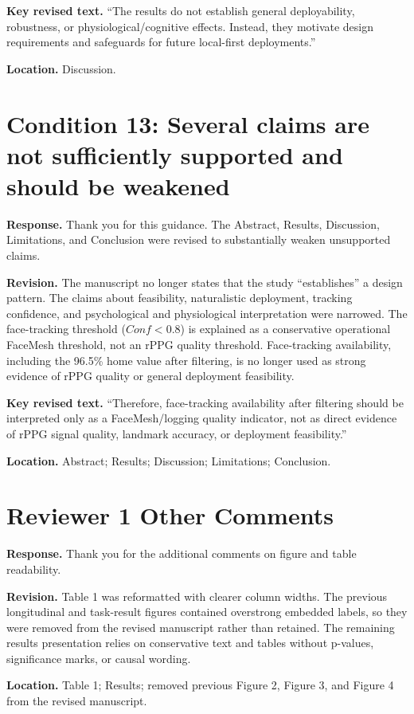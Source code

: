 \documentclass[11pt]{article}
\newcommand{\condition}[2]{\section*{Condition #1: #2}}
\begin{document}
\textbf{Key revised text.}
``The results do not establish general deployability, robustness, or physiological/cognitive effects. Instead, they motivate design requirements and safeguards for future local-first deployments.''

\textbf{Location.}
Discussion.

\condition{13}{Several claims are not sufficiently supported and should be weakened}
\textbf{Response.}
Thank you for this guidance.
The Abstract, Results, Discussion, Limitations, and Conclusion were revised to substantially weaken unsupported claims.

\textbf{Revision.}
The manuscript no longer states that the study ``establishes'' a design pattern.
The claims about feasibility, naturalistic deployment, tracking confidence, and psychological and physiological interpretation were narrowed.
The face-tracking threshold ($Conf < 0.8$) is explained as a conservative operational FaceMesh threshold, not an rPPG quality threshold.
Face-tracking availability, including the 96.5\% home value after filtering, is no longer used as strong evidence of rPPG quality or general deployment feasibility.

\textbf{Key revised text.}
``Therefore, face-tracking availability after filtering should be interpreted only as a FaceMesh/logging quality indicator, not as direct evidence of rPPG signal quality, landmark accuracy, or deployment feasibility.''

\textbf{Location.}
Abstract; Results; Discussion; Limitations; Conclusion.

\section*{Reviewer 1 Other Comments}
\textbf{Response.}
Thank you for the additional comments on figure and table readability.

\textbf{Revision.}
Table 1 was reformatted with clearer column widths.
The previous longitudinal and task-result figures contained overstrong embedded labels, so they were removed from the revised manuscript rather than retained.
The remaining results presentation relies on conservative text and tables without p-values, significance marks, or causal wording.

\textbf{Location.}
Table 1; Results; removed previous Figure 2, Figure 3, and Figure 4 from the revised manuscript.
\end{document}
